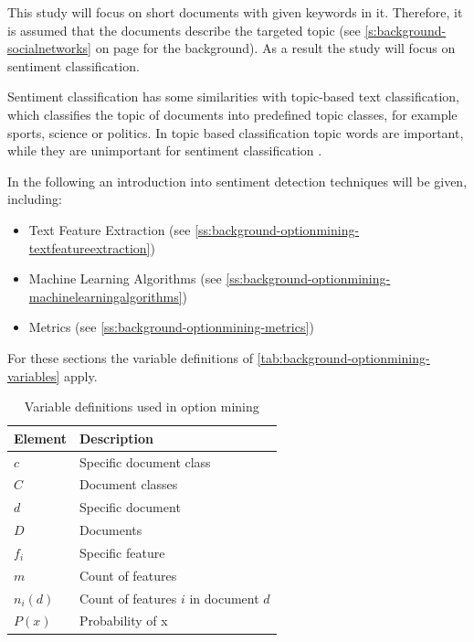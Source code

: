 This study will focus on short documents with given keywords in it.
Therefore, it is assumed that the documents describe the targeted topic (see \cref{s:background-socialnetworks} on page \pageref{s:background-socialnetworks} for the background).
As a result the study will focus on sentiment classification.

Sentiment classification has some similarities with topic-based text classification, which classifies the topic of documents into predefined topic classes, for example sports, science or politics.
In topic based classification topic words are important, while they are unimportant for sentiment classification \citep[page 412f]{Liu2007}.

In the following an introduction into sentiment detection techniques will be given, including:

\begin{itemize}
    \item Text Feature Extraction (see \cref{ss:background-optionmining-textfeatureextraction})
    \item Machine Learning Algorithms (see \cref{ss:background-optionmining-machinelearningalgorithms})
    \item Metrics (see \cref{ss:background-optionmining-metrics})
\end{itemize}

For these sections the variable definitions of \autoref{tab:background-optionmining-variables} apply.

\begin{table}
	\begin{center}
		\begin{tabular}{l l}
			\hline
			\textbf{Element} & \textbf{Description} \\ \hline
			$c$ & Specific document class \\
			$C$ & Document classes \\
			$d$ & Specific document \\
			$D$ & Documents \\
			$f_i$ & Specific feature \\
			$m$ & Count of features \\
			$n_i(d)$ & Count of features $i$ in document $d$ \\
			$P(x)$ & Probability of x \\ \hline
		\end{tabular}

        \caption{Variable definitions used in option mining}
        \label{tab:background-optionmining-variables}
	\end{center}
\end{table}

